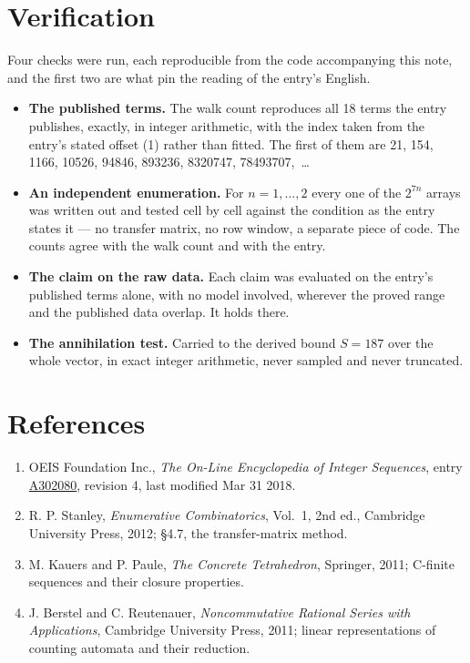 \documentclass[11pt]{article}
\theoremstyle{definition}
\begin{document}
\section{Verification}

Four checks were run, each reproducible from the code accompanying this note, and the first two are what pin the reading of the entry's English.

\begin{itemize}

\item {\bfseries The published terms.} The walk count reproduces all 18 terms the entry publishes, exactly, in integer arithmetic, with the index taken from the entry's stated offset (1) rather than fitted. The first of them are 21, 154, 1166, 10526, 94846, 893236, 8320747, 78493707,~\dots

\item {\bfseries An independent enumeration.} For $n = 1,\dots,2$ every one of the $2^{7n}$ arrays was written out and tested cell by cell against the condition as the entry states it --- no transfer matrix, no row window, a separate piece of code. The counts agree with the walk count and with the entry.

\item {\bfseries The claim on the raw data.} Each claim was evaluated on the entry's published terms alone, with no model involved, wherever the proved range and the published data overlap. It holds there.

\item {\bfseries The annihilation test.} Carried to the derived bound $S = 187$ over the whole vector, in exact integer arithmetic, never sampled and never truncated.

\end{itemize}

\section{References}

\begin{enumerate}

\item OEIS Foundation Inc., \emph{The On-Line Encyclopedia of Integer Sequences}, entry \href{https://oeis.org/A302080}{A302080}, revision 4, last modified Mar 31 2018.

\item R. P. Stanley, \emph{Enumerative Combinatorics}, Vol.~1, 2nd ed., Cambridge University Press, 2012; \S4.7, the transfer-matrix method.

\item M. Kauers and P. Paule, \emph{The Concrete Tetrahedron}, Springer, 2011; C-finite sequences and their closure properties.

\item J. Berstel and C. Reutenauer, \emph{Noncommutative Rational Series with Applications}, Cambridge University Press, 2011; linear representations of counting automata and their reduction.

\end{enumerate}
\end{document}
